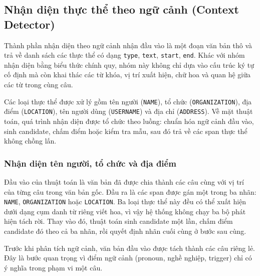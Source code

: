 
\subsection{Nhận diện thực thể theo ngữ cảnh (Context Detector)}

Thành phần nhận diện theo ngữ cảnh nhận đầu vào là một đoạn văn bản thô và
trả về danh sách các thực thể có dạng \texttt{type}, \texttt{text},
\texttt{start}, \texttt{end}. Khác với nhóm nhận diện bằng biểu thức chính quy,
nhóm này không chỉ dựa vào cấu trúc ký tự cố định mà còn khai thác các từ khóa,
vị trí xuất hiện, chữ hoa và quan hệ giữa các từ trong cùng câu.

Các loại thực thể được xử lý gồm tên người (\texttt{NAME}), tổ chức
(\texttt{ORGANIZATION}), địa điểm (\texttt{LOCATION}), tên người dùng
(\texttt{USERNAME}) và địa chỉ (\texttt{ADDRESS}). Về mặt thuật toán, quá trình
nhận diện được tổ chức theo luồng: chuẩn hóa ngữ cảnh đầu vào, sinh candidate,
chấm điểm hoặc kiểm tra mẫu, sau đó trả về các span thực thể không chồng lấn.

\subsubsection{Nhận diện tên người, tổ chức và địa điểm}

Đầu vào của thuật toán là văn bản đã được chia thành các câu cùng với vị trí của
từng câu trong văn bản gốc. Đầu ra là các span được gán một trong ba nhãn:
\texttt{NAME}, \texttt{ORGANIZATION} hoặc \texttt{LOCATION}. Ba loại thực thể
này đều có thể xuất hiện dưới dạng cụm danh từ riêng viết hoa, vì vậy hệ thống
không chạy ba bộ phát hiện tách rời. Thay vào đó, thuật toán sinh candidate một
lần, chấm điểm candidate đó theo cả ba nhãn, rồi quyết định nhãn cuối cùng ở
bước sau cùng.

Trước khi phân tích ngữ cảnh, văn bản đầu vào được tách thành các câu riêng
lẻ. Đây là bước quan trọng vì điểm ngữ cảnh (pronoun, nghề nghiệp, trigger)
chỉ có ý nghĩa trong phạm vi một câu.

